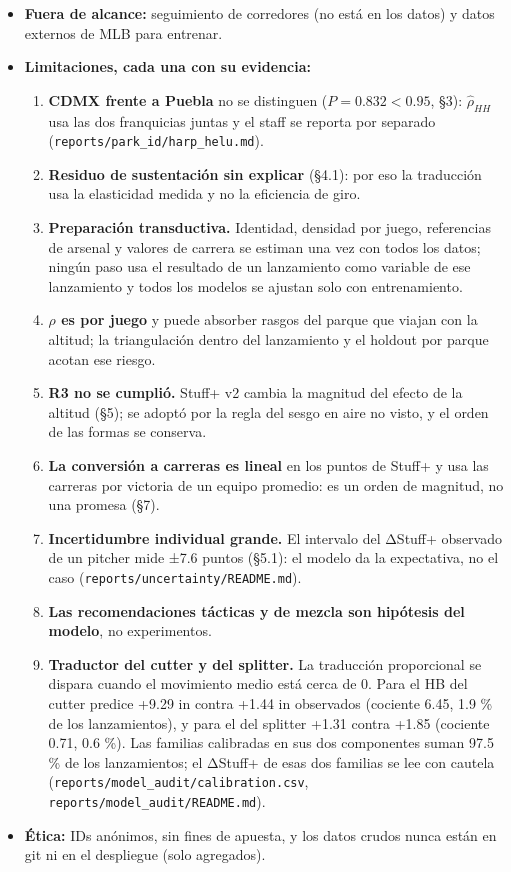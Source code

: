\documentclass[
  english,
  spanish,
  10pt,
  letterpaper,
]{article}
\providecommand{\tightlist}{%
  \setlength{\itemsep}{0pt}\setlength{\parskip}{0pt}}
\let\diablosTT\texttt
\renewcommand{\texttt}[1]{{\color{gris}\fontsize{8.2}{10}\selectfont\diablosTT{#1}}}
\begin{document}
\begin{itemize}
\tightlist
\item
  \textbf{Fuera de alcance:} seguimiento de corredores (no está en los
  datos) y datos externos de MLB para entrenar.
\item
  \textbf{Limitaciones, cada una con su evidencia:}

  \begin{enumerate}
  \def\labelenumi{\arabic{enumi}.}
  \tightlist
  \item
    \textbf{CDMX frente a Puebla} no se distinguen
    (\(P = 0.832 < 0.95\), §3): \(\hat\rho_{HH}\) usa las dos
    franquicias juntas y el staff se reporta por separado
    (\texttt{reports/park\_id/harp\_helu.md}).
  \item
    \textbf{Residuo de sustentación sin explicar} (§4.1): por eso la
    traducción usa la elasticidad medida y no la eficiencia de giro.
  \item
    \textbf{Preparación transductiva.} Identidad, densidad por juego,
    referencias de arsenal y valores de carrera se estiman una vez con
    todos los datos; ningún paso usa el resultado de un lanzamiento como
    variable de ese lanzamiento y todos los modelos se ajustan solo con
    entrenamiento.
  \item
    \textbf{\(\rho\) es por juego} y puede absorber rasgos del parque
    que viajan con la altitud; la triangulación dentro del lanzamiento y
    el holdout por parque acotan ese riesgo.
  \item
    \textbf{R3 no se cumplió.} Stuff+ v2 cambia la magnitud del efecto
    de la altitud (§5); se adoptó por la regla del sesgo en aire no
    visto, y el orden de las formas se conserva.
  \item
    \textbf{La conversión a carreras es lineal} en los puntos de Stuff+
    y usa las carreras por victoria de un equipo promedio: es un orden
    de magnitud, no una promesa (§7).
  \item
    \textbf{Incertidumbre individual grande.} El intervalo del ΔStuff+
    observado de un pitcher mide ±7.6 puntos (§5.1): el modelo da la
    expectativa, no el caso (\texttt{reports/uncertainty/README.md}).
  \item
    \textbf{Las recomendaciones tácticas y de mezcla son hipótesis del
    modelo}, no experimentos.
  \item
    \textbf{Traductor del cutter y del splitter.} La traducción
    proporcional se dispara cuando el movimiento medio está cerca de 0.
    Para el HB del cutter predice +9.29 in contra +1.44 in observados
    (cociente 6.45, 1.9 \% de los lanzamientos), y para el del splitter
    +1.31 contra +1.85 (cociente 0.71, 0.6 \%). Las familias calibradas
    en sus dos componentes suman 97.5 \% de los lanzamientos; el ΔStuff+
    de esas dos familias se lee con cautela
    (\texttt{reports/model\_audit/calibration.csv},
    \texttt{reports/model\_audit/README.md}).
  \end{enumerate}
\item
  \textbf{Ética:} IDs anónimos, sin fines de apuesta, y los datos crudos
  nunca están en git ni en el despliegue (solo agregados).
\end{itemize}
\end{document}
